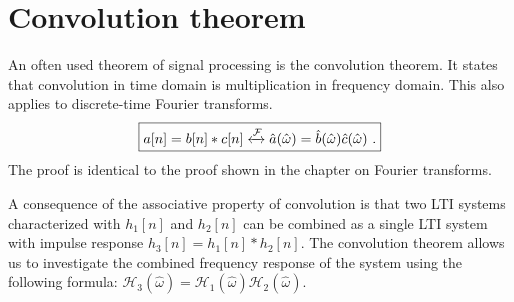 \section{Convolution theorem}
An often used theorem of signal processing is the convolution theorem. It
states that convolution in time domain is multiplication in frequency
domain. This also applies to discrete-time Fourier transforms.
\begin{equation}
    \boxed{
    a[n] = b[n]*c[n] \xleftrightarrow{\mathcal{F}} \hat{a}(\hat{\omega}) = \hat{b}(\hat{\omega})\hat{c}(\hat{\omega})\,\,.
    }
\end{equation}
The proof is identical to the proof shown in the chapter on Fourier transforms.

\begin{marginfigure}

    \begin{center}
    \end{center}
    \caption{A consequence of the associative property of convolution is
    that two LTI systems characterized with $h_1[n]$ and $h_2[n]$ can be
    combined as a single LTI system with impulse response
    $h_3[n]=h_1[n]*h_2[n]$. The convolution theorem allows us to
    investigate the combined frequency response of the system using the following formula:
    $\mathcal{H}_3(\hat{\omega})=\mathcal{H}_1(\hat{\omega})\mathcal{H}_2(\hat{\omega})$.}
    \label{fig:cascade_lti}
\end{marginfigure}



